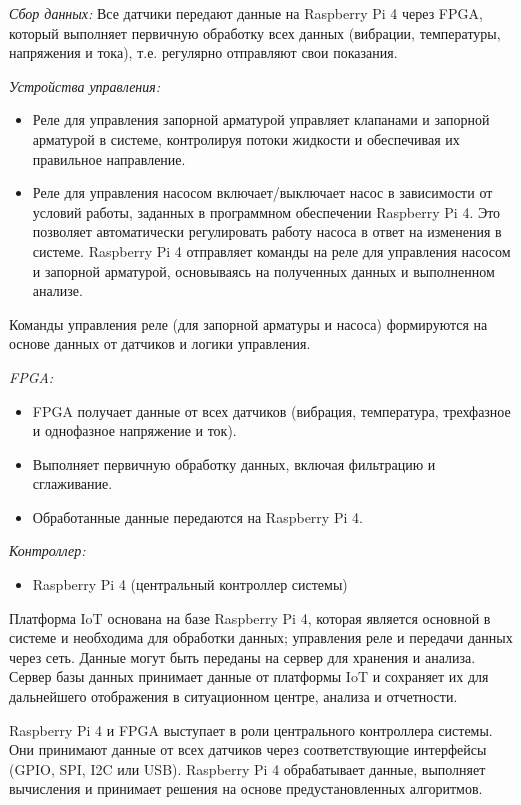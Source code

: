 \emph{Сбор данных:} Все датчики передают данные на Raspberry Pi 4 через
FPGA, который выполняет первичную обработку всех данных (вибрации,
температуры, напряжения и тока), т.е. регулярно отправляют свои
показания.

\emph{Устройства управления:}

\begin{itemize}
\item
  Реле для управления запорной арматурой управляет клапанами и запорной
  арматурой в системе, контролируя потоки жидкости и обеспечивая их
  правильное направление.
\item
  Реле для управления насосом включает/выключает насос в зависимости от
  условий работы, заданных в программном обеспечении Raspberry Pi 4. Это
  позволяет автоматически регулировать работу насоса в ответ на
  изменения в системе. Raspberry Pi 4 отправляет команды на реле для
  управления насосом и запорной арматурой, основываясь на полученных
  данных и выполненном анализе.
\end{itemize}

Команды управления реле (для запорной арматуры и насоса) формируются на
основе данных от датчиков и логики управления.

\emph{FPGA:}

\begin{itemize}
\item
  FPGA получает данные от всех датчиков (вибрация, температура,
  трехфазное и однофазное напряжение и ток).
\item
  Выполняет первичную обработку данных, включая фильтрацию и
  сглаживание.
\item
  Обработанные данные передаются на Raspberry Pi 4.
\end{itemize}

\emph{Контроллер:}

\begin{itemize}
\item
  Raspberry Pi 4 (центральный контроллер системы)
\end{itemize}

Платформа IoT основана на базе Raspberry Pi 4, которая является основной
в системе и необходима для обработки данных; управления реле и передачи
данных через сеть. Данные могут быть переданы на сервер для хранения и
анализа. Сервер базы данных принимает данные от платформы IoT и
сохраняет их для дальнейшего отображения в ситуационном центре, анализа
и отчетности.

Raspberry Pi 4 и FPGA выступает в роли центрального контроллера системы.
Они принимают данные от всех датчиков через соответствующие интерфейсы
(GPIO, SPI, I2C или USB). Raspberry Pi 4 обрабатывает данные, выполняет
вычисления и принимает решения на основе предустановленных алгоритмов.

